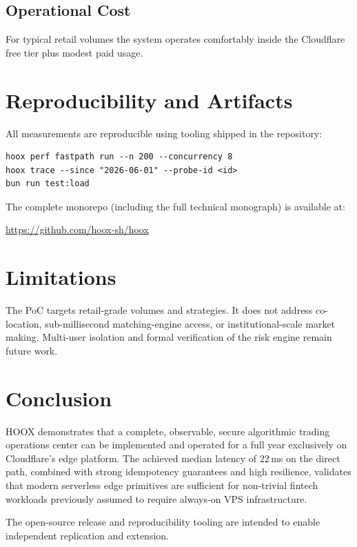 \documentclass[10pt,a4paper]{article}
\newcommand{\textsc}[1]{\textsf{\small #1}}
\begin{document}
\subsection{Operational Cost}

For typical retail volumes the system operates comfortably inside the Cloudflare free tier plus modest paid usage.

\section{Reproducibility and Artifacts}

All measurements are reproducible using tooling shipped in the repository:

\begin{verbatim}
hoox perf fastpath run --n 200 --concurrency 8
hoox trace --since "2026-06-01" --probe-id <id>
bun run test:load
\end{verbatim}

The complete monorepo (including the full technical monograph) is available at:

\url{https://github.com/hoox-sh/hoox}

\section{Limitations}

The PoC targets retail-grade volumes and strategies. It does not address co-location, sub-millisecond matching-engine access, or institutional-scale market making. Multi-user isolation and formal verification of the risk engine remain future work.

\section{Conclusion}

\textsc{HOOX} demonstrates that a complete, observable, secure algorithmic trading operations center can be implemented and operated for a full year exclusively on Cloudflare's edge platform. The achieved median latency of 22\,ms on the direct path, combined with strong idempotency guarantees and high resilience, validates that modern serverless edge primitives are sufficient for non-trivial fintech workloads previously assumed to require always-on VPS infrastructure.

The open-source release and reproducibility tooling are intended to enable independent replication and extension.
\end{document}
